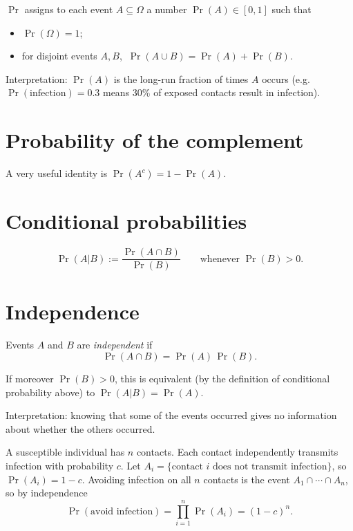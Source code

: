 \begin{definition}
$\Pr$ assigns to each event $A\subseteq\Omega$ a number $\Pr(A)\in[0,1]$ such that
\begin{itemize}[nosep]
  \item $\Pr(\Omega)=1$;
  \item for disjoint events $A,B$, $\ \Pr(A\cup B)=\Pr(A)+\Pr(B)$.
\end{itemize}
\end{definition}

Interpretation: $\Pr(A)$ is the long-run fraction of times $A$ occurs (e.g. $\Pr(\text{infection})=0.3$ means 30\% of exposed contacts result in infection).

\section{Probability of the complement}
A very useful identity is $\Pr(A^c) = 1-\Pr(A)$.


\section{Conditional probabilities}
\[
\Pr(A|B) := \frac{\Pr(A \cap B)}{\Pr(B)} \qquad \text{whenever $\Pr(B) > 0$.}
\]
\section{Independence}

\begin{definition}
Events $A$ and $B$ are \emph{independent} if
\[
\Pr(A \cap B) = \Pr(A)\,\Pr(B).
\]
\end{definition}

If moreover $\Pr(B)>0$, this is equivalent (by the definition of
conditional probability above) to $\Pr(A|B) = \Pr(A)$.

Interpretation: knowing that some of the events occurred gives no information about whether the others occurred.

\begin{example}
A susceptible individual has $n$ contacts. Each contact independently transmits infection with probability $c$. Let $A_i=\{\text{contact } i \text{ does not transmit infection}\}$, so $\Pr(A_i)=1-c$. Avoiding infection on all $n$ contacts is the event $A_1\cap\cdots\cap A_n$, so by independence
\[
\Pr(\text{avoid infection}) = \prod_{i=1}^n \Pr(A_i) = (1-c)^n.
\]
\end{example}

